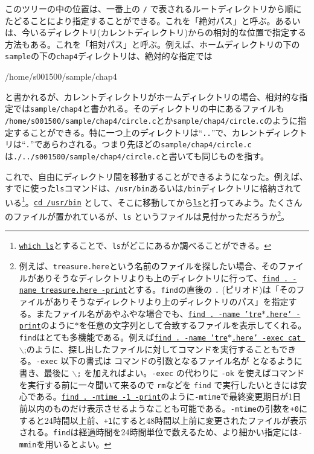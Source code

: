 \noindent このツリーの中の位置は、一番上の \texttt{/} で表されるルートディレクトリから順にたどることにより指定することができる。これを「絶対パス」と呼ぶ。あるいは、今いるディレクトリ(カレントディレクトリ)からの相対的な位置で指定する方法もある。これを「相対パス」と呼ぶ。例えば、ホームディレクトリの下の\texttt{sample}の下の\texttt{chap4}ディレクトリは、絶対的な指定では
\begin{tt}
    /home/s001500/sample/chap4
\end{tt}
と書かれるが、カレントディレクトリがホームディレクトリの場合、相対的な指定では\texttt{sample/chap4}と書かれる。そのディレクトリの中にあるファイルも \texttt{/home/s001500/sample/chap4/circle.c}とか\texttt{sample/chap4/circle.c}のように指定することができる。特に一つ上のディレクトリは``\texttt{..}''で、カレントディレクトリは``\texttt{.}''であらわされる。つまり先ほどの\texttt{sample/chap4/circle.c}は\texttt{./../s001500/sample/chap4/circle.c}と書いても同じものを指す。

これで、自由にディレクトリ間を移動することができるようになった。例えば、すでに使った\texttt{ls}コマンドは、\texttt{/usr/bin}あるいは\texttt{/bin}ディレクトリに格納されている\footnote{\underline{\texttt{which ls}}とすることで、\texttt{ls}がどこにあるか調べることができる。}。\underline{\texttt{cd /usr/bin}} として、そこに移動してから\underline{\texttt{ls}}と打ってみよう。たくさんのファイルが置かれているが、\texttt{ls} というファイルは見付かっただろうか\footnote{例えば、\texttt{treasure.here}という名前のファイルを探したい場合、そのファイルがありそうなディレクトリよりも上のディレクトリに行って、\underline{\texttt{find . -name treasure.here -print}}とする。\texttt{find}の直後の \texttt{.} (ピリオド)は「そのファイルがありそうなディレクトリより上のディレクトリのパス」を指定する。またファイル名があやふやな場合でも、\underline{\texttt{find . -name 'tre\(\ast\).here' -print}}のように\(\ast\)を任意の文字列として合致するファイルを表示してくれる。\texttt{find}はとても多機能である。例えば\underline{\texttt{find . -name 'tre\(\ast\).here' -exec cat \textbraceleft \textbraceright} \(\backslash\);}のように、探し出したファイルに対してコマンドを実行することもできる。\texttt{-exec} 以下の書式は コマンドの引数となるファイル名が \textbraceleft \textbraceright となるように書き、最後に \texttt{\(\backslash\);} を加えればよい。\texttt{-exec} の代わりに \texttt{-ok} を使えばコマンドを実行する前に一々聞いて来るので \texttt{rm}などを \texttt{find} で実行したいときには安心である。\underline{\texttt{find\ .\ -mtime -1 -print}}のように\texttt{-mtime}で最終変更期日が1日前以内のものだけ表示させるようなことも可能である。\texttt{-mtime}の引数を\texttt{+0}にすると24時間以上前、\texttt{+1}にすると48時間以上前に変更されたファイルが表示される。\texttt{find}は経過時間を24時間単位で数えるため、より細かい指定には\texttt{-mmin}を用いるとよい。}。

